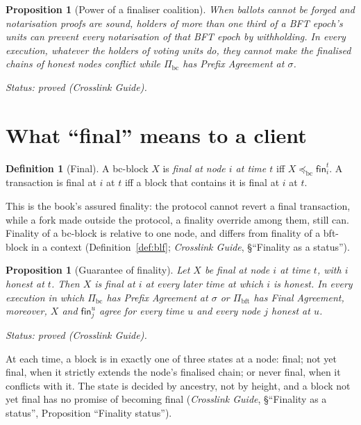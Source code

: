\documentclass[11pt,a4paper]{article}
\newtheorem{proposition}[theorem]{Proposition}
\theoremstyle{definition}
\newtheorem{definition}[theorem]{Definition}
\newcommand{\bc}{\mathrm{bc}}
\newcommand{\bft}{\mathrm{bft}}
\newcommand{\preceqbc}{\preceq_{\bc}}
\newcommand{\Pibc}{\Pi_{\bc}}
\newcommand{\Pibft}{\Pi_{\bft}}
\newcommand{\fin}{\mathsf{fin}}
\begin{document}
\begin{proposition}[Power of a finaliser coalition]\label{prop:coalition}
When ballots cannot be forged and notarisation proofs are sound, holders of
more than one third of a BFT epoch's units can prevent every notarisation of
that BFT epoch by withholding. In every execution, whatever the holders of
voting units do, they cannot make the finalised chains of honest nodes
conflict while $\Pibc$ has Prefix Agreement at $\sigma$.

Status: proved (Crosslink Guide).
\end{proposition}

\section{What ``final'' means to a client}\label{sec:client}

\begin{definition}[Final]\label{def:final}
A bc-block $X$ is \emph{final at node $i$ at time $t$} iff $X \preceqbc
\fin_i^t$. A transaction is final at $i$ at $t$ iff a block that contains
it is final at $i$ at $t$.
\end{definition}

This is the book's assured finality: the protocol cannot revert a final
transaction, while a fork made outside the protocol, a finality override
among them, still can. Finality of a bc-block is relative to one node, and
differs from finality of a bft-block in a context (Definition~\ref{def:blf};
\emph{Crosslink Guide}, \S``Finality as a status'').

\begin{proposition}[Guarantee of finality]\label{prop:final-guarantee}
Let $X$ be final at node $i$ at time $t$, with $i$ honest at $t$. Then $X$ is
final at $i$ at every later time at which $i$ is honest. In every execution
in which $\Pibc$ has Prefix Agreement at $\sigma$ or $\Pibft$ has Final
Agreement, moreover, $X$ and $\fin_j^u$ agree for every time $u$ and every
node $j$ honest at $u$.

Status: proved (Crosslink Guide).
\end{proposition}

At each time, a block is in exactly one of three states at a node: final; not
yet final, when it strictly extends the node's finalised chain; or never
final, when it conflicts with it. The state is decided by ancestry, not by
height, and a block not yet final has no promise of becoming final
(\emph{Crosslink Guide}, \S``Finality as a status'', Proposition ``Finality
status'').
\end{document}
